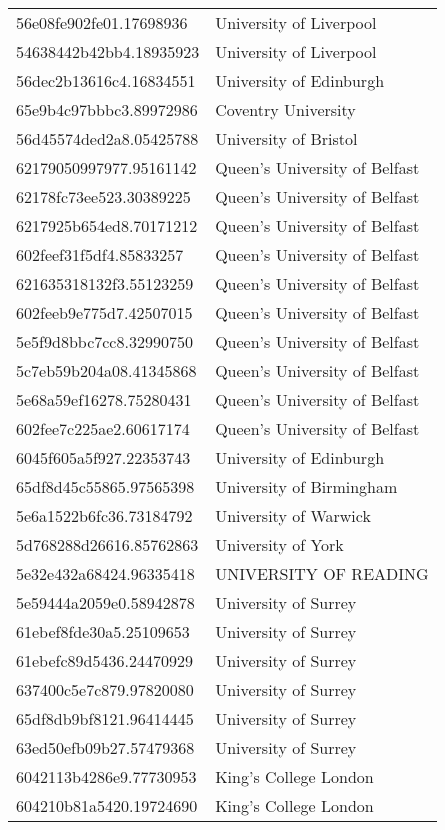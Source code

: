 \begin{tabular}{ll}
56e08fe902fe01.17698936 & University of Liverpool \\
54638442b42bb4.18935923 & University of Liverpool \\
56dec2b13616c4.16834551 & University of Edinburgh \\
65e9b4c97bbbc3.89972986 & Coventry University \\
56d45574ded2a8.05425788 & University of Bristol \\
62179050997977.95161142 & Queen's University of Belfast \\
62178fc73ee523.30389225 & Queen's University of Belfast \\
6217925b654ed8.70171212 & Queen's University of Belfast \\
602feef31f5df4.85833257 & Queen's University of Belfast \\
621635318132f3.55123259 & Queen's University of Belfast \\
602feeb9e775d7.42507015 & Queen's University of Belfast \\
5e5f9d8bbc7cc8.32990750 & Queen's University of Belfast \\
5c7eb59b204a08.41345868 & Queen's University of Belfast \\
5e68a59ef16278.75280431 & Queen's University of Belfast \\
602fee7c225ae2.60617174 & Queen's University of Belfast \\
6045f605a5f927.22353743 & University of Edinburgh \\
65df8d45c55865.97565398 & University of Birmingham \\
5e6a1522b6fc36.73184792 & University of Warwick \\
5d768288d26616.85762863 & University of York \\
5e32e432a68424.96335418 & UNIVERSITY OF READING \\
5e59444a2059e0.58942878 & University of Surrey \\
61ebef8fde30a5.25109653 & University of Surrey \\
61ebefc89d5436.24470929 & University of Surrey \\
637400c5e7c879.97820080 & University of Surrey \\
65df8db9bf8121.96414445 & University of Surrey \\
63ed50efb09b27.57479368 & University of Surrey \\
6042113b4286e9.77730953 & King's College London \\
604210b81a5420.19724690 & King's College London \\

\end{tabular}
